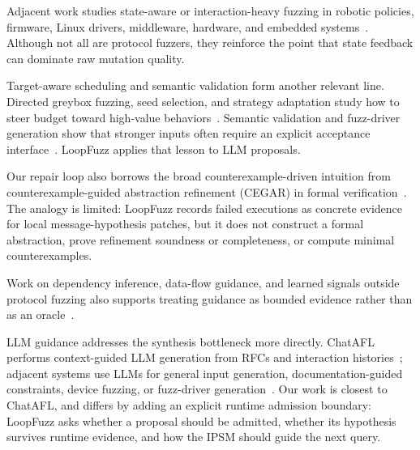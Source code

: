 \documentclass[final,5p,times,number]{elsarticle}
\begin{document}
Adjacent work studies state-aware or interaction-heavy fuzzing in robotic policies, firmware, Linux drivers, middleware, hardware, and embedded systems~\cite{pgfuzz_policy_guided_fuzzing_2021,android_smarttvs_vulnerability_discovery_2021,fuzzware_mmio_2022,statefuzz_linux_driver_2022,differential_fuzzing_data_distribution_2024,fuzzing_hardware_like_software_2022,coverage_guided_fuzzing_embedded_2023}. Although not all are protocol fuzzers, they reinforce the point that state feedback can dominate raw mutation quality.

Target-aware scheduling and semantic validation form another relevant line. Directed greybox fuzzing, seed selection, and strategy adaptation study how to steer budget toward high-value behaviors~\cite{directed_greybox_fuzzing_2017,windranger_blocks_2022,when_analysis_2025,seed_selection_successful_fuzzing_2021,one_fuzzing_strategy_rule_2022,regression_greybox_fuzzing_2021,efficient_errors_2022}. Semantic validation and fuzz-driver generation show that stronger inputs often require an explicit acceptance interface~\cite{one_engine_to_fuzz_em_all_2021,apicraft_fuzz_driver_2021}. LoopFuzz applies that lesson to LLM proposals.

Our repair loop also borrows the broad counterexample-driven intuition from counterexample-guided abstraction refinement (CEGAR) in formal verification~\cite{cegar_cav2000}. The analogy is limited: LoopFuzz records failed executions as concrete evidence for local message-hypothesis patches, but it does not construct a formal abstraction, prove refinement soundness or completeness, or compute minimal counterexamples.

Work on dependency inference, data-flow guidance, and learned signals outside protocol fuzzing also supports treating guidance as bounded evidence rather than as an oracle~\cite{rulf_rust_library_fuzzing_2021,smartian_analyses_2021,magneto_step_wise_approach_2024}.

LLM guidance addresses the synthesis bottleneck more directly. ChatAFL performs context-guided LLM generation from RFCs and interaction histories~\cite{chatafl}; adjacent systems use LLMs for general input generation, documentation-guided constraints, device fuzzing, or fuzz-driver generation~\cite{fuzz4all_universal_fuzzing_large_2024,llmif_augmented_large_language_2024,docter_documentation_guided_fuzzing_2022,carpetfuzz_documentation_2023,matter_llm_specification_2024,prompt_fuzzing_fuzz_driver_2024}. Our work is closest to ChatAFL, and differs by adding an explicit runtime admission boundary: LoopFuzz asks whether a proposal should be admitted, whether its hypothesis survives runtime evidence, and how the IPSM should guide the next query.
\end{document}
